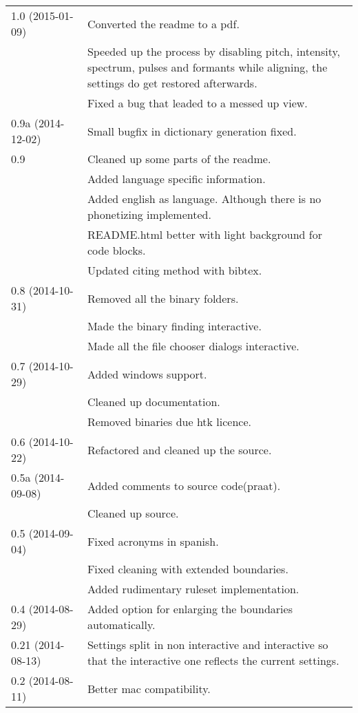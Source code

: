 \begin{longtable}{|p{0.22\linewidth}p{0.8\linewidth}|}
	\hline
	1.0 (2015-01-09) & \tabitem Converted the readme to a pdf.\\
		& \tabitem Speeded up the process by disabling pitch, intensity,
spectrum, pulses and formants while aligning, the settings do get restored
afterwards.\\
		& \tabitem Fixed a bug that leaded to a messed up view.\\
	\hline
	0.9a (2014-12-02) & \tabitem Small bugfix in dictionary generation fixed.\\
	\hline
	0.9 & \tabitem Cleaned up some parts of the readme.\\
		& \tabitem Added language specific information.\\
		& \tabitem Added english as language. Although there is no phonetizing
implemented.\\
		& \tabitem README.html better with light background for code blocks.\\
		& \tabitem Updated citing method with bibtex.\\
	\hline
	0.8 (2014-10-31) & \tabitem Removed all the binary folders.\\
		& \tabitem Made the binary finding interactive.\\
		& \tabitem Made all the file chooser dialogs interactive.\\
	\hline
	0.7 (2014-10-29) & \tabitem Added windows support.\\
		&	\tabitem Cleaned up documentation.\\
		& \tabitem Removed binaries due htk licence.\\
	\hline
	0.6 (2014-10-22) & \tabitem Refactored and cleaned up the source.\\
	\hline
	0.5a (2014-09-08) & \tabitem Added comments to source code(praat).\\
		& \tabitem Cleaned up source.\\
	\hline
	0.5 (2014-09-04) & \tabitem Fixed acronyms in spanish.\\
		& \tabitem Fixed cleaning with extended boundaries.\\
		& \tabitem Added rudimentary ruleset implementation.\\
	\hline
	0.4 (2014-08-29) & \tabitem Added option for enlarging the boundaries
automatically.\\
	\hline
	0.21 (2014-08-13) & \tabitem Settings split in non interactive and
interactive so that the interactive one reflects the current settings.\\
	\hline
	0.2 (2014-08-11) & \tabitem Better mac compatibility.\\

\end{longtable}
